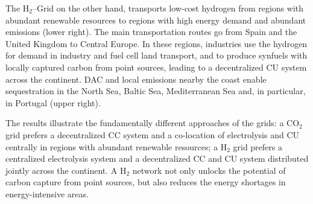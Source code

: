 \documentclass[twocolumn]{article}
\newcommand{\carbon}{CO$_2$}
\newcommand{\hydrogen}{H$_2$}
\newcommand{\hydrogengrid}{\hydrogen{}--Grid}
\begin{document}
The \hydrogengrid{} on the other hand, transports low-cost hydrogen from regions with abundant renewable resources to regions with high energy demand and abundant emissions (lower right). The main transportation routes go from Spain and the United Kingdom to Central Europe. In these regions, industries use the hydrogen for demand in industry and fuel cell land transport, and to produce synfuels with locally captured carbon from point sources, leading to a decentralized CU system across the continent. DAC and local emissions nearby the coast enable sequestration in the North Sea, Baltic Sea, Mediterranean Sea and, in particular, in Portugal (upper right).

The results illustrate the fundamentally different approaches of the grids: a \carbon{} grid prefers a decentralized CC system and a co-location of electrolysis and CU centrally in regions with abundant renewable resources; a \hydrogen{} grid prefers a centralized electrolysis system and a decentralized CC and CU system distributed jointly across the continent. A \hydrogen{} network not only unlocks the potential of carbon capture from point sources, but also reduces the energy shortages in energy-intensive areas.
\end{document}
